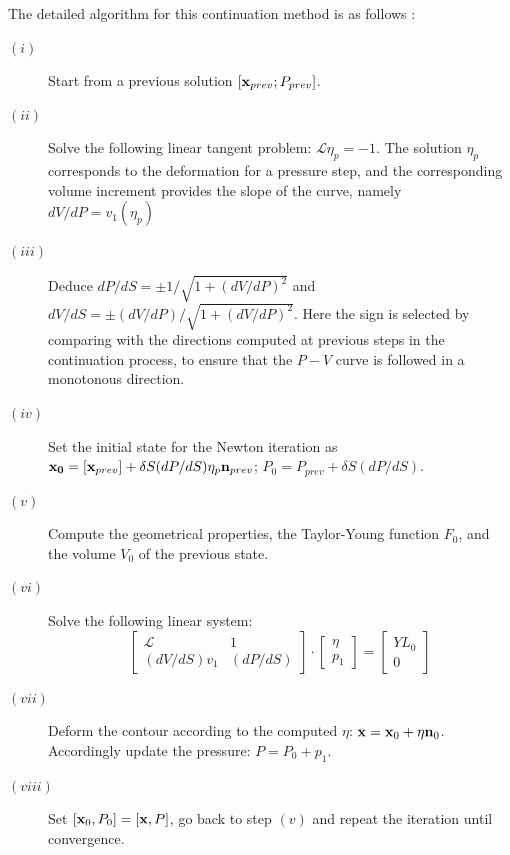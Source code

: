 \documentclass{jfm}
\newcommand\be{\begin{equation}}
\newcommand\ee{\end{equation}}
\begin{document}
The detailed algorithm for this continuation method is as follows :

\begin{description}

\item[$(i)$ ] Start from a previous solution $[{\bf x}_{prev} ; P_{prev}]$.

\item[$(ii)$ ] Solve the following linear tangent problem: ${\mathcal L} \eta_p = -1$.  The solution $\eta_p$ corresponds to the deformation for a pressure step, and the corresponding volume increment provides 
the slope of the curve, namely $dV/dP = v_1(\eta_p)$ 

\item [$(iii)$ ] Deduce $dP/dS = \pm 1/\sqrt{1+(dV/dP)^2}$ and $dV/dS = \pm (dV/dP)/\sqrt{1+(dV/dP)^2}$. Here the sign is selected by comparing with the directions computed at previous steps in the continuation process, to ensure that the $P-V$ curve is followed in a monotonous direction.

\item[$(iv)$ ] Set the initial state for the Newton iteration as $ {\bf x_0}= [{\bf x}_{prev}] + \delta S (dP/dS) \eta_p
 {\bf n}_{prev} $; $P_0 = P_{prev} +  \delta S (dP/dS) $.

\item[$(v)$ ] Compute the geometrical properties, the Taylor-Young function $F_0$, and the volume $V_0$ of the previous state.

\item[$(vi)$ ] Solve the following linear system: 
\be 
\left[
\begin{array}{cc} {\mathcal L} &  1\\ (dV/dS) v_1 & (dP/dS) \end{array} 
\right] 
 \cdot 
\left[
\begin{array}{c} \eta \\ p_1 \end{array} 
\right]
= 
\left[
\begin{array}{c} YL_0 \\ 0 \end{array} 
\right]
\ee

\item[$(vii)$ ] Deform the contour according to the computed $\eta$:  ${\bf x} = {\bf x}_0 + \eta {\bf n}_0$. Accordingly update the pressure: $P = P_0 + p_1$.

\item[$(viii)$ ] Set $[{\bf x}_0,P_0] = [{\bf x},P]$, go back to step $(v)$ and repeat the iteration until convergence. 

\end{description}
\end{document}
